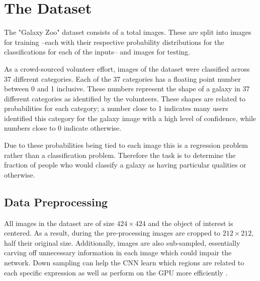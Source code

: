 \section{The Dataset}

The "Galaxy Zoo" dataset consists of a total  images. These are split into  images for training --each with their respective probability distributions for the classifications for each of the inputs-- and  images for testing.

As a crowd-sourced volunteer effort, images of the dataset were classified across 37 different categories. Each of the 37 categories has a floating point number between 0 and 1 inclusive. These numbers represent the shape of a galaxy in 37 different categories as identified by the volunteers. These shapes are related to probabilities for each category; a number close to 1 indicates many users identified this category for the galaxy image with a high level of confidence, while numbers close to 0 indicate otherwise.

Due to these probabilities being tied to each image this is a regression problem rather than a classification problem. Therefore the task is to determine the fraction of people who would classify a galaxy as having particular qualities or otherwise.

\subsection{Data Preprocessing}

All images in the dataset are of size $424\times424$ and the object of interest is centered. As a result, during the pre-processing images are cropped to $212\times212$, half their original size. Additionally, images are also sub-sampled, essentially carving off unnecessary information in each image which could impair the network. Down sampling can help the CNN learn which regions are related to each specific expression as well as perform on the GPU more efficiently \cite{deep-learning-review}.
